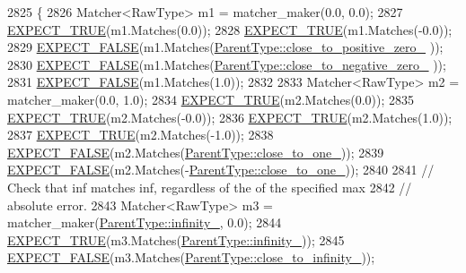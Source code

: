 \begin{DoxyCode}
2825                                               \{
2826     Matcher<RawType> m1 = matcher\_maker(0.0, 0.0);
2827     \hyperlink{gtest_8h_ac33e7cdfb5d44a7a0f0ab552eb5c3c6a}{EXPECT\_TRUE}(m1.Matches(0.0));
2828     \hyperlink{gtest_8h_ac33e7cdfb5d44a7a0f0ab552eb5c3c6a}{EXPECT\_TRUE}(m1.Matches(-0.0));
2829     \hyperlink{gtest_8h_aeb6c7ae89f440c90c1a1815951c836da}{EXPECT\_FALSE}(m1.Matches(\hyperlink{classtesting_1_1gmock__matchers__test_1_1FloatingPointTest_a750555206ab9d5959d6dc84f8a760c57}{ParentType::close\_to\_positive\_zero\_}
      ));
2830     \hyperlink{gtest_8h_aeb6c7ae89f440c90c1a1815951c836da}{EXPECT\_FALSE}(m1.Matches(\hyperlink{classtesting_1_1gmock__matchers__test_1_1FloatingPointTest_a641f5e223c25b6d6fb108b322acaa39d}{ParentType::close\_to\_negative\_zero\_}
      ));
2831     \hyperlink{gtest_8h_aeb6c7ae89f440c90c1a1815951c836da}{EXPECT\_FALSE}(m1.Matches(1.0));
2832 
2833     Matcher<RawType> m2 = matcher\_maker(0.0, 1.0);
2834     \hyperlink{gtest_8h_ac33e7cdfb5d44a7a0f0ab552eb5c3c6a}{EXPECT\_TRUE}(m2.Matches(0.0));
2835     \hyperlink{gtest_8h_ac33e7cdfb5d44a7a0f0ab552eb5c3c6a}{EXPECT\_TRUE}(m2.Matches(-0.0));
2836     \hyperlink{gtest_8h_ac33e7cdfb5d44a7a0f0ab552eb5c3c6a}{EXPECT\_TRUE}(m2.Matches(1.0));
2837     \hyperlink{gtest_8h_ac33e7cdfb5d44a7a0f0ab552eb5c3c6a}{EXPECT\_TRUE}(m2.Matches(-1.0));
2838     \hyperlink{gtest_8h_aeb6c7ae89f440c90c1a1815951c836da}{EXPECT\_FALSE}(m2.Matches(\hyperlink{classtesting_1_1gmock__matchers__test_1_1FloatingPointTest_a34c97dc5dc07ea62764de87fdd8b7764}{ParentType::close\_to\_one\_}));
2839     \hyperlink{gtest_8h_aeb6c7ae89f440c90c1a1815951c836da}{EXPECT\_FALSE}(m2.Matches(-\hyperlink{classtesting_1_1gmock__matchers__test_1_1FloatingPointTest_a34c97dc5dc07ea62764de87fdd8b7764}{ParentType::close\_to\_one\_}));
2840 
2841     \textcolor{comment}{// Check that inf matches inf, regardless of the of the specified max}
2842     \textcolor{comment}{// absolute error.}
2843     Matcher<RawType> m3 = matcher\_maker(\hyperlink{classtesting_1_1gmock__matchers__test_1_1FloatingPointTest_a21d8a019a6365ddff80e301a6163f43f}{ParentType::infinity\_}, 0.0);
2844     \hyperlink{gtest_8h_ac33e7cdfb5d44a7a0f0ab552eb5c3c6a}{EXPECT\_TRUE}(m3.Matches(\hyperlink{classtesting_1_1gmock__matchers__test_1_1FloatingPointTest_a21d8a019a6365ddff80e301a6163f43f}{ParentType::infinity\_}));
2845     \hyperlink{gtest_8h_aeb6c7ae89f440c90c1a1815951c836da}{EXPECT\_FALSE}(m3.Matches(\hyperlink{classtesting_1_1gmock__matchers__test_1_1FloatingPointTest_a6fc8ac2030f4883e1c84da3a21bbb7c3}{ParentType::close\_to\_infinity\_}));

\end{DoxyCode}
